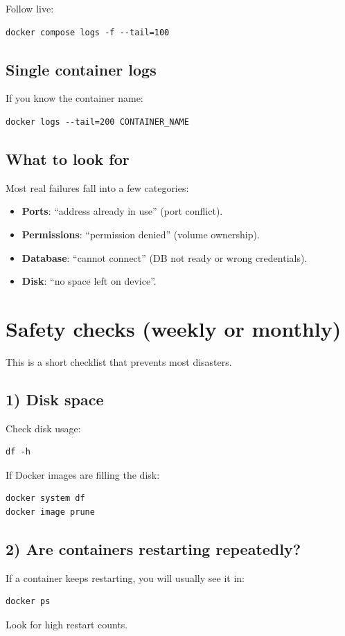 Follow live:
\begin{lstlisting}
docker compose logs -f --tail=100
\end{lstlisting}

\subsection{Single container logs}
If you know the container name:
\begin{lstlisting}
docker logs --tail=200 CONTAINER_NAME
\end{lstlisting}

\subsection{What to look for}
Most real failures fall into a few categories:
\begin{itemize}[leftmargin=*]
  \item \textbf{Ports}: ``address already in use'' (port conflict).
  \item \textbf{Permissions}: ``permission denied'' (volume ownership).
  \item \textbf{Database}: ``cannot connect'' (DB not ready or wrong credentials).
  \item \textbf{Disk}: ``no space left on device''.
\end{itemize}


\section{Safety checks (weekly or monthly)}
This is a short checklist that prevents most disasters.

\subsection{1) Disk space}
Check disk usage:
\begin{lstlisting}
df -h
\end{lstlisting}

If Docker images are filling the disk:
\begin{lstlisting}
docker system df
docker image prune
\end{lstlisting}

\subsection{2) Are containers restarting repeatedly?}
If a container keeps restarting, you will usually see it in:
\begin{lstlisting}
docker ps
\end{lstlisting}
Look for high restart counts.


